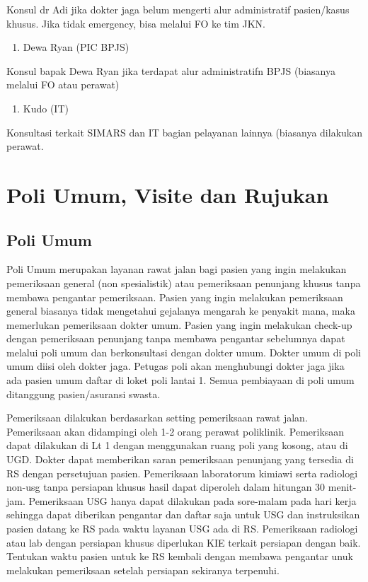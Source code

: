 \documentclass[
]{book}
\providecommand{\tightlist}{%
  \setlength{\itemsep}{0pt}\setlength{\parskip}{0pt}}
\begin{document}
Konsul dr Adi jika dokter jaga belum mengerti alur administratif pasien/kasus khusus. Jika tidak emergency, bisa melalui FO ke tim JKN.

\begin{enumerate}
\def\labelenumi{\arabic{enumi}.}
\setcounter{enumi}{1}
\tightlist
\item
  Dewa Ryan (PIC BPJS)
\end{enumerate}

Konsul bapak Dewa Ryan jika terdapat alur administratifn BPJS (biasanya melalui FO atau perawat)

\begin{enumerate}
\def\labelenumi{\arabic{enumi}.}
\setcounter{enumi}{2}
\tightlist
\item
  Kudo (IT)
\end{enumerate}

Konsultasi terkait SIMARS dan IT bagian pelayanan lainnya (biasanya dilakukan perawat.

\hypertarget{poli-umum-visite-dan-rujukan}{%
\chapter{Poli Umum, Visite dan Rujukan}\label{poli-umum-visite-dan-rujukan}}

\hypertarget{poli-umum}{%
\section{Poli Umum}\label{poli-umum}}

Poli Umum merupakan layanan rawat jalan bagi pasien yang ingin melakukan pemeriksaan general (non spesialistik) atau pemeriksaan penunjang khusus tanpa membawa pengantar pemeriksaan. Pasien yang ingin melakukan pemeriksaan general biasanya tidak mengetahui gejalanya mengarah ke penyakit mana, maka memerlukan pemeriksaan dokter umum. Pasien yang ingin melakukan check-up dengan pemeriksaan penunjang tanpa membawa pengantar sebelumnya dapat melalui poli umum dan berkonsultasi dengan dokter umum. Dokter umum di poli umum diisi oleh dokter jaga. Petugas poli akan menghubungi dokter jaga jika ada pasien umum daftar di loket poli lantai 1. Semua pembiayaan di poli umum ditanggung pasien/asuransi swasta.

Pemeriksaan dilakukan berdasarkan setting pemeriksaan rawat jalan. Pemeriksaan akan didampingi oleh 1-2 orang perawat poliklinik. Pemeriksaan dapat dilakukan di Lt 1 dengan menggunakan ruang poli yang kosong, atau di UGD. Dokter dapat memberikan saran pemeriksaan penunjang yang tersedia di RS dengan persetujuan pasien. Pemeriksaan laboratorum kimiawi serta radiologi non-usg tanpa persiapan khusus hasil dapat diperoleh dalam hitungan 30 menit-jam. Pemeriksaan USG hanya dapat dilakukan pada sore-malam pada hari kerja sehingga dapat diberikan pengantar dan daftar saja untuk USG dan instruksikan pasien datang ke RS pada waktu layanan USG ada di RS. Pemeriksaan radiologi atau lab dengan persiapan khusus diperlukan KIE terkait persiapan dengan baik. Tentukan waktu pasien untuk ke RS kembali dengan membawa pengantar unuk melakukan pemeriksaan setelah persiapan sekiranya terpenuhi.
\end{document}
